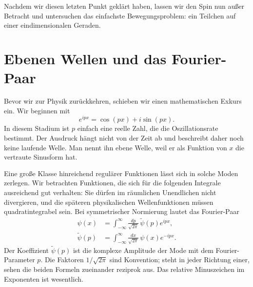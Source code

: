 \begin{classroomqa}
\end{classroomqa}

Nachdem wir diesen letzten Punkt geklärt haben, lassen wir den Spin nun außer Betracht und untersuchen das einfachste Bewegungsproblem: ein Teilchen auf einer eindimensionalen Geraden.

\section{Ebenen Wellen und das Fourier-Paar}

Bevor wir zur Physik zurückkehren, schieben wir einen mathematischen Exkurs ein. Wir beginnen mit
\begin{equation}
e^{ipx}=\cos(px)+i\sin(px).
\end{equation}
In diesem Stadium ist \(p\) einfach eine reelle Zahl, die die Oszillationsrate bestimmt. Der Ausdruck hängt nicht von der Zeit ab und beschreibt daher noch keine laufende Welle. Man nennt ihn ebene Welle, weil er als Funktion von \(x\) die vertraute Sinusform hat.

Eine große Klasse hinreichend regulärer Funktionen lässt sich in solche Moden zerlegen. Wir betrachten Funktionen, die sich für die folgenden Integrale ausreichend gut verhalten: Sie dürfen im räumlichen Unendlichen nicht divergieren, und die späteren physikalischen Wellenfunktionen müssen quadratintegrabel sein. Bei symmetrischer Normierung lautet das Fourier-Paar
\begin{align}
\psi(x)
&=
\int_{-\infty}^{\infty}
\frac{dp}{\sqrt{2\pi}}\,
\widetilde{\psi}(p)e^{ipx},
\label{eq:l9-fourier-forward}\\
\widetilde{\psi}(p)
&=
\int_{-\infty}^{\infty}
\frac{dx}{\sqrt{2\pi}}\,
\psi(x)e^{-ipx}.
\label{eq:l9-fourier-inverse}
\end{align}
Der Koeffizient \(\widetilde{\psi}(p)\) ist die komplexe Amplitude der Mode mit dem Fourier-Parameter \(p\). Die Faktoren \(1/\sqrt{2\pi}\) sind Konvention; steht in jeder Richtung einer, sehen die beiden Formeln zueinander reziprok aus. Das relative Minuszeichen im Exponenten ist wesentlich.

